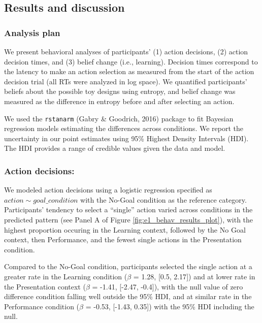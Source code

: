 \documentclass[10pt, letterpaper]{article}
\begin{document}
\subsection{Results and discussion}\label{results-and-discussion}

\subsubsection{Analysis plan}\label{analysis-plan}

We present behavioral analyses of participants' (1) action decisions,
(2) action decision times, and (3) belief change (i.e., learning).
Decision times correspond to the latency to make an action selection as
measured from the start of the action decision trial (all RTs were
analyzed in log space). We quantified participants' beliefs about the
possible toy designs using entropy, and belief change was measured as
the difference in entropy before and after selecting an action.

We used the \texttt{rstanarm} (Gabry \& Goodrich, 2016) package to fit
Bayesian regression models estimating the differences across conditions.
We report the uncertainty in our point estimates using 95\% Highest
Density Intervals (HDI). The HDI provides a range of credible values
given the data and model.

\subsubsection{Action decisions:}\label{action-decisions}

We modeled action decisions using a logistic regression specified as
\texttt{$action \sim goal\_condition$} with the No-Goal condition as the
reference category. Participants' tendency to select a ``single'' action
varied across conditions in the predicted pattern (see Panel A of Figure
\ref{fig:e1_behav_results_plot}), with the highest proportion occuring
in the Learning context, followed by the No Goal context, then
Performance, and the fewest single actions in the Presentation
condition.

Compared to the No-Goal condition, participants selected the single
action at a greater rate in the Learning condition (\(\beta\) = 1.28,
{[}0.5, 2.17{]}) and at lower rate in the Presentation context
(\(\beta\) = -1.41, {[}-2.47, -0.4{]}), with the null value of zero
difference condition falling well outside the 95\% HDI, and at similar
rate in the Performance condition (\(\beta\) = -0.53, {[}-1.43, 0.35{]})
with the 95\% HDI including the null.
\end{document}
